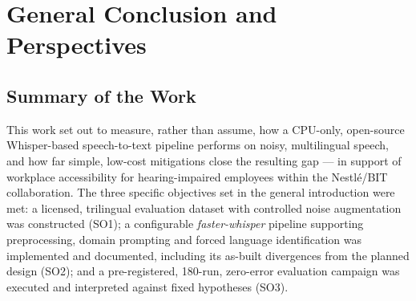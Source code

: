 \documentclass[12pt]{report}
\begin{document}
\chapter*{General Conclusion and Perspectives}
\thispagestyle{fancy}
\section*{Summary of the Work}
This work set out to measure, rather than assume, how a CPU-only, open-source Whisper-based speech-to-text pipeline performs on noisy, multilingual speech, and how far simple, low-cost mitigations close the resulting gap --- in support of workplace accessibility for hearing-impaired employees within the Nestl\'e/BIT collaboration. The three specific objectives set in the general introduction were met: a licensed, trilingual evaluation dataset with controlled noise augmentation was constructed (SO1); a configurable \textit{faster-whisper} pipeline supporting preprocessing, domain prompting and forced language identification was implemented and documented, including its as-built divergences from the planned design (SO2); and a pre-registered, 180-run, zero-error evaluation campaign was executed and interpreted against fixed hypotheses (SO3).
\end{document}
